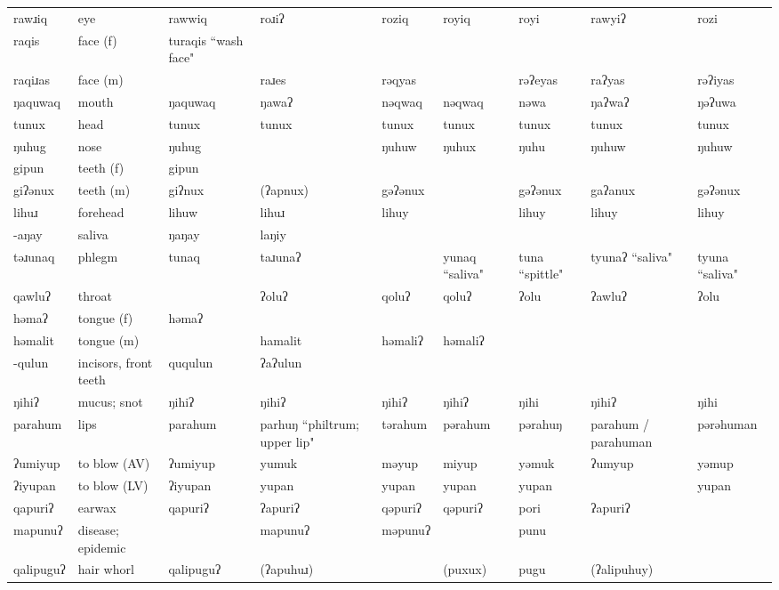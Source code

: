 \begin{landscape}
\begin{longtable}{*{9}{>{\raggedright\arraybackslash}p{}}}
\text{*}rawɹiq & eye & rawwiq & roɹiʔ & roziq & royiq & royi & rawyiʔ & rozi\\
\text{*}raqis & face (f) & turaqis ``wash face" &  &  &  &  &  & \\
\text{*}raqiɹas & face (m) &  & raɹes & rəqyas &  & rəʔeyas & raʔyas & rəʔiyas\\
\text{*}ŋaquwaq & mouth & ŋaquwaq & ŋawaʔ & nəqwaq & nəqwaq & nəwa & ŋaʔwaʔ & ŋəʔuwa\\
\text{*}tunux & head & tunux & tunux & tunux & tunux & tunux & tunux & tunux\\
\text{*}ŋuhug & nose & ŋuhug &  & ŋuhuw & ŋuhux & ŋuhu & ŋuhuw & ŋuhuw\\
\text{*}gipun & teeth (f) & gipun &  &  &  &  &  & \\
\text{*}giʔənux & teeth (m) & giʔnux & (ʔapnux) & gəʔənux &  & gəʔənux & gaʔanux & gəʔənux\\
\text{*}lihuɹ & forehead & lihuw & lihuɹ & lihuy &  & lihuy & lihuy & lihuy\\
\text{*}-aŋay & saliva & ŋaŋay & laŋiy &  &  &  &  & \\
\text{*}təɹunaq & phlegm & tunaq & taɹunaʔ &  & yunaq ``saliva" & tuna ``spittle" & tyunaʔ ``saliva" & tyuna ``saliva"\\
\text{*}qawluʔ & throat &  & ʔoluʔ & qoluʔ & qoluʔ & ʔolu & ʔawluʔ & ʔolu\\
\text{*}həmaʔ & tongue (f) & həmaʔ &  &  &  &  &  & \\
\text{*}həmalit & tongue (m) &  & hamalit & həmaliʔ & həmaliʔ &  &  & \\
\text{*}-qulun & incisors, front teeth & ququlun & ʔaʔulun &  &  &  &  & \\
\text{*}ŋihiʔ & mucus; snot & ŋihiʔ & ŋihiʔ & ŋihiʔ & ŋihiʔ & ŋihi & ŋihiʔ & ŋihi\\
\text{*}parahum & lips & parahum & parhuŋ ``philtrum; upper lip" & tərahum & pərahum & pərahuŋ & parahum / parahuman & pərəhuman\\
\text{*}ʔumiyup & to blow (AV) & ʔumiyup & yumuk & məyup & miyup & yəmuk & ʔumyup & yəmup\\
\text{*}ʔiyupan & to blow (LV) & ʔiyupan & yupan & yupan & yupan & yupan &  & yupan\\
\text{*}qapuriʔ & earwax & qapuriʔ & ʔapuriʔ & qəpuriʔ & qəpuriʔ & pori & ʔapuriʔ & \\
\text{*}mapunuʔ & disease; epidemic &  & mapunuʔ & məpunuʔ &  & punu &  & \\
\text{*}qalipuguʔ & hair whorl & qalipuguʔ & (ʔapuhuɹ) &  & (puxux) & pugu & (ʔalipuhuy) & \\

\end{longtable}
\end{landscape}
